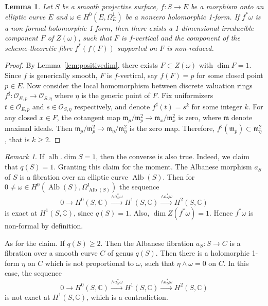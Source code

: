 \documentclass[a4paper,12pt,reqno]{amsart}
\newtheorem{lemma}[theorem]{Lemma}
\theoremstyle{question}
\theoremstyle{definition}
\theoremstyle{remark}
\newtheorem{remark}[theorem]{Remark}
\theoremstyle{cited}
\theoremstyle{citeddef}
\def\CC{{\mathbb C}}
\def\cO{\mathcal{O}}
\DeclareMathOperator{\Alb}{Alb}
\DeclareMathOperator{\alb}{alb}
\begin{document}
\begin{lemma}\label{lem:nonreduced}
    Let $S$ be a smooth projective surface, $f\colon S\to E$ be a morphism onto an elliptic curve $E$ and $\omega\in H^0(E, \Omega_E^1)$ be a nonzero holomorphic 1-form. If $f^{\ast}\omega$ is a non-formal holomorphic 1-form, then there exists a 1-dimensional irreducible component $F$ of $Z(\omega)$, such that $F$ is $f$-vertical and the component of the scheme-theoretic fibre $f^{\ast}(f(F))$ supported on $F$ is non-reduced. 
\end{lemma}
\begin{proof}
    By Lemma~\ref{lem:positivedim}, there exists $F\subset Z(\omega)$ with $\dim F=1$. Since $f$ is generically smooth, $F$ is $f$-vertical, say $f(F)=p$ for some closed point $p\in E$. Now consider the local homomorphism between discrete valuation rings $f^{\sharp}\colon \cO_{E,p}\to \cO_{S,\eta}$ where $\eta$ is the generic point of $F$. Fix  uniformizers $t\in \cO_{E,p}\text{ and } s\in \cO_{S,\eta}$ respectively, and denote $f^{\sharp}(t)=s^{k}$ for some integer $k$. For any closed $x\in F$, the cotangent map $\mathfrak{m}_{p}/{\mathfrak{m}_{p}^2}\to\mathfrak{m}_{x}/{\mathfrak{m}_{x}^2}$ is zero, where $\mathfrak{m}$ denote maximal ideals. Then $\mathfrak{m}_{p}/{\mathfrak{m}_{p}^2}\to\mathfrak{m}_{\eta}/{\mathfrak{m}_{\eta}^2}$ is the zero map. Therefore, $f^{\sharp}(\mathfrak{m}_p)\subset {\mathfrak{m}_{\eta}^2}$, that is $k\geq 2$.
\end{proof}
\begin{remark}\label{rmk:q=1}
    If $\alb.\dim S=1$, then the converse is also true. Indeed, we claim that $q(S)=1$. Granting this claim for the moment. The Albanese morphism $a_S$ of $S$ is a fibration over an elliptic curve $\Alb(S)$. Then for $0\neq\omega\in H^0(\Alb(S), \Omega^1_{\Alb(S)})$ the sequence  \[
 0\to H^0(S,\CC) \xrightarrow{\wedge a_S^{\ast}\omega} H^1(S,\CC) \xrightarrow{\wedge a_S^{\ast}\omega} H^2(S,\CC) 
 \]
        is exact at $H^1(S,\CC)$, since $q(S)=1$.  Also, $\dim Z(f^{\ast}\omega)=1$. Hence $f^{\ast}\omega$ is non-formal by definition.
        
        As for the claim. If $q(S)\geq 2$. Then the Albanese fibration $a_S\colon S\to C$ is a fibration over a smooth curve $C$ of genus $q(S)$. Then there is a holomorphic 1-form $\eta$ on $C$ which is not proportional to $\omega$, such that $\eta\wedge\omega=0$ on $C$. In this case, the sequence  \[
 0\to H^0(S,\CC) \xrightarrow{\wedge a_S^{\ast}\omega} H^1(S,\CC) \xrightarrow{\wedge a_S^{\ast}\omega} H^2(S,\CC) 
 \]
        is not exact at $H^1(S,\CC)$, which is a contradiction.
        
\end{remark}
   
\end{document}
